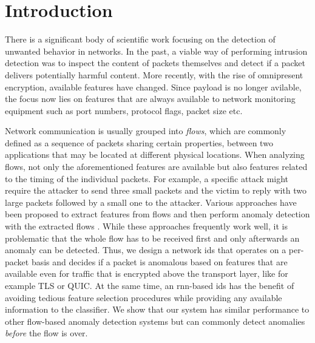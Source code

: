 \documentclass[conference]{IEEEtran}
\begin{document}
\maketitle

\section{Introduction}

There is a significant body of scientific work focusing on the detection of unwanted behavior in networks. In the past, a viable way of performing intrusion detection was to inspect the content of packets themselves and detect if a packet delivers potentially harmful content. More recently, with the rise of omnipresent encryption, available features have changed. Since payload is no longer avilable, the focus now lies on features that are always available to network monitoring equipment such as port numbers, protocol flags, packet size etc. 

Network communication is usually grouped into \textit{flows}, which are commonly defined as a sequence of packets sharing certain properties, between two applications that may be located at different physical locations.
When analyzing flows, not only the aforementioned features are available but also features related to the timing of the individual packets. %
For example, a specific attack might require the attacker to send three small packets and the victim to reply with two large packets followed by a small one to the attacker. Various approaches have been proposed to extract features from flows and then perform anomaly detection with the extracted flows \cite{meghdouri_analysis_2018}.
While these approaches frequently work well, it is problematic that the whole flow has to be received first and only afterwards an anomaly can be detected. Thus, we design a network \gls{ids} that operates on a per-packet basis and decides if a packet is anomalous based on features that are available even for traffic that is encrypted above the transport layer, like for example TLS or QUIC.
At the same time, an \gls{rnn}-based \gls{ids} has the benefit of avoiding tedious feature selection procedures while providing any available information to the classifier.
We show that our system has similar performance to other flow-based anomaly detection systems but can commonly detect anomalies \textit{before} the flow is over. 
\end{document}
